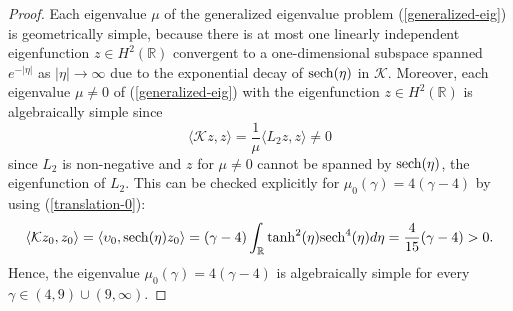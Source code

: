 \documentclass[12pt,reqno]{amsart}
\numberwithin{equation}{section}
\begin{document}
\begin{proof}
Each eigenvalue $\mu$ of the generalized eigenvalue problem (\ref{generalized-eig}) is geometrically simple, 
because there is at most one linearly independent eigenfunction $z \in H^2(\mathbb{R})$ convergent to a one-dimensional 
subspace spanned $e^{-|\eta|}$ as $|\eta| \to \infty$ due to the exponential decay of ${\rm sech}(\eta)$ in $\mathcal{K}$. 
Moreover, each eigenvalue $\mu \neq 0$ of (\ref{generalized-eig}) with the eigenfunction $z \in H^2(\mathbb{R})$ is algebraically simple since 
$$
\langle \mathcal{K} z, z \rangle = \frac{1}{\mu} \langle L_2 z, z \rangle \neq 0
$$
since $L_2$ is non-negative and $z$ for $\mu \neq 0$ cannot be spanned by ${\rm sech}(\eta)$, the eigenfunction of $L_2$. 
This can be checked explicitly for $\mu_0(\gamma) = 4 (\gamma - 4)$ by using 
(\ref{translation-0}):
\begin{equation}
    \label{conclusion}
\langle \mathcal{K} z_0, z_0 \rangle = \langle \upsilon_0, {\rm sech}(\eta) z_0 \rangle =  (\gamma - 4) \int_{\mathbb{R}} \tanh^2(\eta) {\rm sech}^4(\eta) d\eta 
= \frac{4}{15} (\gamma - 4) > 0.
\end{equation}
Hence, the eigenvalue $\mu_0(\gamma) = 4 (\gamma - 4)$ is algebraically simple for every $\gamma \in (4,9) \cup (9,\infty)$.


\end{proof}
\end{document}

